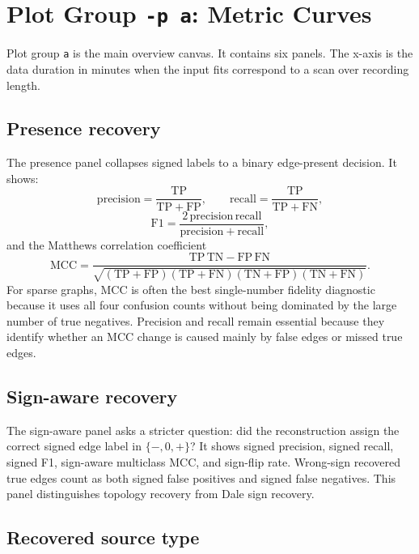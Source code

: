 \documentclass[11pt]{article}
\begin{document}
\section{Plot Group \texttt{-p a}: Metric Curves}
\label{sec:plot-a}

Plot group \texttt{a} is the main overview canvas. It contains six panels.
The x-axis is the data duration in minutes when the input fits correspond to
a scan over recording length.

\subsection{Presence recovery}

The presence panel collapses signed labels to a binary edge-present decision.
It shows:
\[
\mathrm{precision}=\frac{\mathrm{TP}}{\mathrm{TP}+\mathrm{FP}},\qquad
\mathrm{recall}=\frac{\mathrm{TP}}{\mathrm{TP}+\mathrm{FN}},
\]
\[
\mathrm{F1}=
\frac{2\,\mathrm{precision}\,\mathrm{recall}}
{\mathrm{precision}+\mathrm{recall}},
\]
and the Matthews correlation coefficient
\[
\mathrm{MCC}=
\frac{\mathrm{TP}\,\mathrm{TN}-\mathrm{FP}\,\mathrm{FN}}
{\sqrt{(\mathrm{TP}+\mathrm{FP})(\mathrm{TP}+\mathrm{FN})
(\mathrm{TN}+\mathrm{FP})(\mathrm{TN}+\mathrm{FN})}} .
\]
For sparse graphs, MCC is often the best single-number fidelity diagnostic
because it uses all four confusion counts without being dominated by the
large number of true negatives. Precision and recall remain essential
because they identify whether an MCC change is caused mainly by false edges
or missed true edges.

\subsection{Sign-aware recovery}

The sign-aware panel asks a stricter question: did the reconstruction assign
the correct signed edge label in \(\{-,0,+\}\)? It shows signed precision,
signed recall, signed F1, sign-aware multiclass MCC, and sign-flip rate.
Wrong-sign recovered true edges count as both signed false positives and
signed false negatives. This panel distinguishes topology recovery from Dale
sign recovery.

\subsection{Recovered source type}
\end{document}
